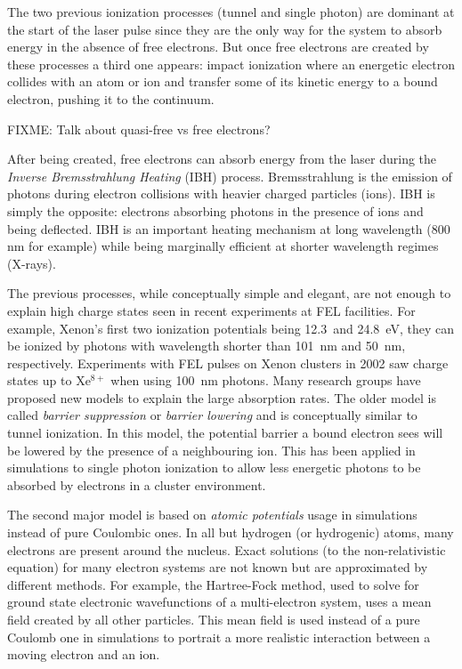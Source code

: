 The two previous ionization processes (tunnel and single photon) are dominant
at the start of the laser pulse since they are the only way for the system to
absorb energy in the absence of free electrons. But once free electrons are
created by these processes a third one appears: impact ionization where an
energetic electron collides with an atom or ion and transfer some of its
kinetic energy to a bound electron, pushing it to the continuum.

FIXME: Talk about quasi-free vs free electrons?

After being created, free electrons can absorb energy from
the laser during the \textit{Inverse Bremsstrahlung Heating} (IBH) process.
Bremsstrahlung is the emission of photons during electron collisions with
heavier charged particles (ions). IBH is simply the opposite: electrons
absorbing photons in the presence of ions and being deflected. IBH is
an important heating mechanism at long wavelength (800 nm for example) while
being marginally efficient at shorter wavelength regimes (X-rays)\citeneeded.

The previous processes, while conceptually simple and elegant, are not
enough to explain high charge states seen in recent experiments at FEL
facilities. For example, Xenon's first two ionization potentials being 12.3~and
24.8~eV, they can be ionized by photons with wavelength shorter than 101~nm and
50~nm, respectively. Experiments with FEL pulses on Xenon clusters in 2002 saw
charge states up to Xe$^{8+}$ when using 100~nm photons\cite{Wabnitz2002}.
Many research groups have proposed new models to
explain the large absorption rates. The older model is called \textit{barrier
suppression} or \textit{barrier lowering} and is conceptually similar to tunnel
ionization. In this model, the potential barrier a bound electron sees will be
lowered by the presence of a neighbouring ion. This has been applied in
simulations to single photon ionization to allow less energetic photons to be
absorbed by electrons in a cluster environment\cite{Siedschlag2004}.

The second major model is based on \textit{atomic potentials} usage in
simulations instead of pure Coulombic ones. In all but hydrogen (or hydrogenic)
atoms, many electrons are present around the nucleus. Exact solutions (to the
non-relativistic \schrodinger equation) for many electron systems are not known
but are approximated by different methods. For example, the Hartree-Fock
method, used to solve for ground state electronic wavefunctions of a
multi-electron system, uses a mean field created by all other particles. This
mean field is used instead of a pure Coulomb one in simulations to portrait a
more realistic interaction between a moving electron and an
ion\cite{Greene2003}.

